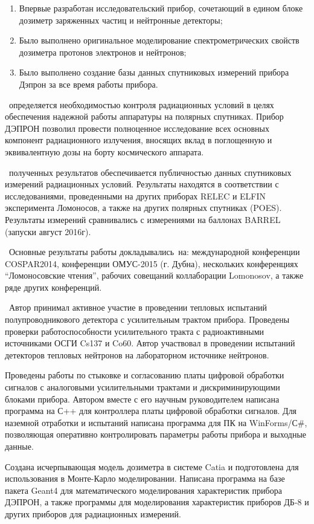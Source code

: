 \novelty
\begin{enumerate}
  \item Впервые разработан исследовательский прибор, сочетающий в едином блоке дозиметр заряженных частиц и нейтронные детекторы;
  \item Было выполнено оригинальное моделирование спектрометрических свойств дозиметра протонов электронов и нейтронов;
  \item Было выполнено создание базы данных спутниковых измерений прибора Дэпрон за все время работы прибора.
\end{enumerate}

\influence\ определяется необходимостью контроля радиационных условий в целях обеспечения надежной работы аппаратуры на полярных спутниках. Прибор ДЭПРОН позволил провести полноценное исследование всех основных компонент радиационного излучения, вносящих вклад в поглощенную и эквивалентную дозы на борту космического аппарата. 

\reliability\ полученных результатов обеспечивается публичностью данных спутниковых измерений радиационных условий. Результаты находятся в соответствии с исследованиями, проведенными на других приборах RELEC и ELFIN эксперимента Ломоносов, а также на других полярных спутниках (POES). Результаты измерений сравнивались с измерениями на баллонах BARREL (запуски август 2016г).

\probation\
Основные результаты работы докладывались~на:
международной конференции COSPAR2014, конференции ОМУС-2015 (г. Дубна), нескольких конференциях ``Ломоносовские чтения'', рабочих совещаний коллаборации Lomonosov, а также ряде других конференций.

\contribution\ Автор принимал активное участие в проведении тепловых испытаний полупроводникового детектора с усилительным трактом прибора. Проведены проверки работоспособности усилительного тракта с радиоактивными источниками ОСГИ Cs137 и Co60. Автор участвовал в проведении испытаний детекторов тепловых нейтронов на лабораторном источнике нейтронов. 

Проведены работы по стыковке и согласованию платы цифровой обработки сигналов с аналоговыми усилительными трактами и дискриминирующими блоками прибора. Автором вместе с его научным руководителем написана программа на С++ для контроллера платы цифровой обработки сигналов. Для наземной отработки и испытаний написана программа для ПК на WinForms/С\#, позволяющая оперативно контролировать параметры работы прибора и выходные данные. 

Создана исчерпывающая модель дозиметра в системе Catia и подготовлена для использования в Монте-Карло моделировании. Написана программа на базе пакета Geant4 для математического моделирования характеристик прибора ДЭПРОН, а также программы для моделирования характеристик приборов ДБ-8 и других приборов для радиационных измерений. 

